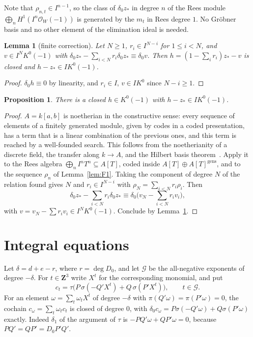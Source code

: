 \documentclass[11pt]{amsart}
\newtheorem{proposition}[theorem]{Proposition}
\newtheorem{lemma}[theorem]{Lemma}
\theoremstyle{definition}
\theoremstyle{remark}
\newcommand{\Z}{\mathbf Z}
\begin{document}
Note that $\rho_{n,t}\in I^{n-1}$, so the class of $\delta_0z_*$ in degree
$n$ of the Rees module $\bigoplus_nH^1(I^n\mathcal O_W(-1))$ is generated by
the $m_t$ in Rees degree $1$. No Gröbner basis and no other element of the
elimination ideal is needed.

\begin{lemma}[finite correction]\label{lem:correction}
Let $N\ge1$, $r_i\in I^{N-i}$ for $1\le i<N$, and $v\in I^NK^0(-1)$ with
$\delta_0z_*-\sum_{i<N}r_i\delta_0z_*\equiv\delta_0v$. Then
$h=(1-\sum_ir_i)z_*-v$ is closed and $h-z_*\in IK^0(-1)$.
\end{lemma}
\begin{proof}
$\delta_0h\equiv0$ by linearity, and $r_i\in I$, $v\in IK^0$ since
$N-i\ge1$.
\end{proof}

\begin{proposition}\label{prop:lift}
There is a closed $h\in K^0(-1)$ with $h-z_*\in IK^0(-1)$.
\end{proposition}
\begin{proof}
$A=k[a,b]$ is noetherian in the constructive sense: every sequence of
elements of a finitely generated module, given by codes in a coded
presentation, has a term that is a linear combination of the previous
ones, and this term is reached by a well-founded search. This follows from
the noetherianity of a discrete field, the transfer along $k\to A$, and the
Hilbert basis theorem~\cite{CPersson}. Apply it to the Rees algebra
$\bigoplus_nI^nT^n\subseteq A[T]$, coded inside $A[T]\oplus A[T]^{\mathrm{gens}}$,
and to the sequence $\rho_n$ of Lemma~\ref{lem:F1}. Taking the component of
degree $N$ of the relation found gives $N$ and $r_i\in I^{N-i}$ with
$\rho_N=\sum_{i<N}r_i\rho_i$. Then
\[
 \delta_0z_*-\sum_{i<N}r_i\delta_0z_*\equiv
 \delta_0\Big(v_N-\sum_{i<N}r_iv_i\Big),
\]
with $v=v_N-\sum r_iv_i\in I^NK^0(-1)$. Conclude by
Lemma~\ref{lem:correction}.
\end{proof}

\section{Integral equations}\label{sec:integral}

Let $\delta=d+e-r$, where $r=\deg D_0$, and let $\mathcal G$ be the
all-negative exponents of degree $-\delta$. For $t\in\Z^3$ write $X^t$ for
the corresponding monomial, and put
\[
 c_t=\tau\big(P\,\sigma(-Q'X^t)+Q\,\sigma(P'X^t)\big),\qquad t\in\mathcal G .
\]
For an element $\omega=\sum_t\omega_tX^t$ of degree $-\delta$ with
$\pi(Q'\omega)=\pi(P'\omega)=0$, the cochain $c_\omega=\sum_t\omega_tc_t$ is
closed of degree $0$, with $\delta_0c_\omega=P\sigma(-Q'\omega)+Q\sigma(P'\omega)$
exactly. Indeed $\delta_1$ of the argument of $\tau$ is
$-PQ'\omega+QP'\omega=0$, because $PQ'=QP'=D_0P'Q'$.
\end{document}
